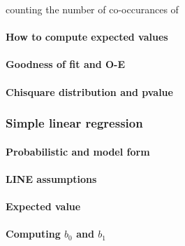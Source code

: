 \documentclass[11pt]{article}
\begin{document}
counting the number of co-occurances of

\hypertarget{how-to-compute-expected-values}{%
\paragraph{How to compute expected
values}\label{how-to-compute-expected-values}}

\hypertarget{goodness-of-fit-and-o-e}{%
\paragraph{Goodness of fit and O-E}\label{goodness-of-fit-and-o-e}}

\hypertarget{chisquare-distribution-and-pvalue}{%
\paragraph{Chisquare distribution and
pvalue}\label{chisquare-distribution-and-pvalue}}

    \hypertarget{simple-linear-regression}{%
\subsubsection{Simple linear
regression}\label{simple-linear-regression}}

\hypertarget{probabilistic-and-model-form}{%
\paragraph{Probabilistic and model
form}\label{probabilistic-and-model-form}}

\hypertarget{line-assumptions}{%
\paragraph{LINE assumptions}\label{line-assumptions}}

\hypertarget{expected-value}{%
\paragraph{Expected value}\label{expected-value}}

\hypertarget{computing-b_0-and-b_1}{%
\paragraph{\texorpdfstring{Computing \(b_{0}\) and
\(b_{1}\)}{Computing b\_\{0\} and b\_\{1\}}}\label{computing-b_0-and-b_1}}
\end{document}
